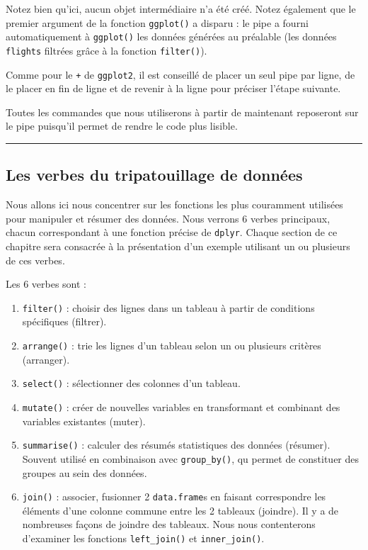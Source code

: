 \documentclass[a4paperpaper,]{article}
\providecommand{\tightlist}{%
  \setlength{\itemsep}{0pt}\setlength{\parskip}{0pt}}
\begin{document}
Notez bien qu'ici, aucun objet intermédiaire n'a été créé. Notez également que le premier argument de la fonction \texttt{ggplot()} a disparu : le pipe a fourni automatiquement à \texttt{ggplot()} les données générées au préalable (les données \texttt{flights} filtrées grâce à la fonction \texttt{filter()}).

Comme pour le \texttt{+} de \texttt{ggplot2}, il est conseillé de placer un seul pipe par ligne, de le placer en fin de ligne et de revenir à la ligne pour préciser l'étape suivante.

Toutes les commandes que nous utiliserons à partir de maintenant reposeront sur le pipe puisqu'il permet de rendre le code plus lisible.

\begin{center}\rule{0.5\linewidth}{\linethickness}\end{center}

\hypertarget{les-verbes-du-tripatouillage-de-donnees}{%
\subsection{Les verbes du tripatouillage de données}\label{les-verbes-du-tripatouillage-de-donnees}}

Nous allons ici nous concentrer sur les fonctions les plus couramment utilisées pour manipuler et résumer des données. Nous verrons 6 verbes principaux, chacun correspondant à une fonction précise de \texttt{dplyr}. Chaque section de ce chapitre sera consacrée à la présentation d'un exemple utilisant un ou plusieurs de ces verbes.

Les 6 verbes sont :

\begin{enumerate}
\def\labelenumi{\arabic{enumi}.}
\tightlist
\item
  \texttt{filter()} : choisir des lignes dans un tableau à partir de conditions spécifiques (filtrer).
\item
  \texttt{arrange()} : trie les lignes d'un tableau selon un ou plusieurs critères (arranger).
\item
  \texttt{select()} : sélectionner des colonnes d'un tableau.
\item
  \texttt{mutate()} : créer de nouvelles variables en transformant et combinant des variables existantes (muter).
\item
  \texttt{summarise()} : calculer des résumés statistiques des données (résumer). Souvent utilisé en combinaison avec \texttt{group\_by()}, qu permet de constituer des groupes au sein des données.
\item
  \texttt{join()} : associer, fusionner 2 \texttt{data.frame}s en faisant correspondre les éléments d'une colonne commune entre les 2 tableaux (joindre). Il y a de nombreuses façons de joindre des tableaux. Nous nous contenterons d'examiner les fonctions \texttt{left\_join()} et \texttt{inner\_join()}.
\end{enumerate}
\end{document}
